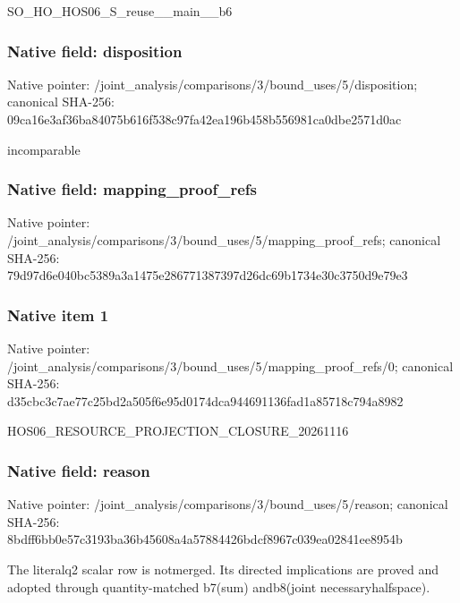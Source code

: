 \documentclass[10pt,a4paper]{article}
\begin{document}
\begingroup\raggedright\sloppy SO\_\allowbreak{}HO\_\allowbreak{}HOS06\_\allowbreak{}S\_\allowbreak{}reuse\_\allowbreak{}\_\allowbreak{}main\_\allowbreak{}\_\allowbreak{}b6\par\endgroup

\subsubsection{Native field: disposition}
Native pointer: /joint\_\allowbreak{}analysis/comparisons/3/bound\_\allowbreak{}uses/5/disposition; canonical SHA-256: 09ca16e3af36ba84075b616f538c97fa42ea196b458b556981ca0dbe2571d0ac

\begingroup\raggedright\sloppy incomparable\par\endgroup

\subsubsection{Native field: mapping\_\allowbreak{}proof\_\allowbreak{}refs}
Native pointer: /joint\_\allowbreak{}analysis/comparisons/3/bound\_\allowbreak{}uses/5/mapping\_\allowbreak{}proof\_\allowbreak{}refs; canonical SHA-256: 79d97d6e040bc5389a3a1475e286771387397d26dc69b1734e30c3750d9e79e3

\subsubsection{Native item 1}
Native pointer: /joint\_\allowbreak{}analysis/comparisons/3/bound\_\allowbreak{}uses/5/mapping\_\allowbreak{}proof\_\allowbreak{}refs/0; canonical SHA-256: d35cbc3c7ae77c25bd2a505f6e95d0174dca944691136fad1a85718c794a8982

\begingroup\raggedright\sloppy HOS06\_\allowbreak{}RESOURCE\_\allowbreak{}PROJECTION\_\allowbreak{}CLOSURE\_\allowbreak{}20261116\par\endgroup

\subsubsection{Native field: reason}
Native pointer: /joint\_\allowbreak{}analysis/comparisons/3/bound\_\allowbreak{}uses/5/reason; canonical SHA-256: 8bdff6bb0e57c3193ba36b45608a4a57884426bdcf8967c039ea02841ee8954b

\begingroup\raggedright\sloppy The literalq2 scalar row is notmerged. Its directed implications are proved and adopted through quantity-matched b7(sum) andb8(joint necessaryhalfspace).\par\endgroup
\end{document}
